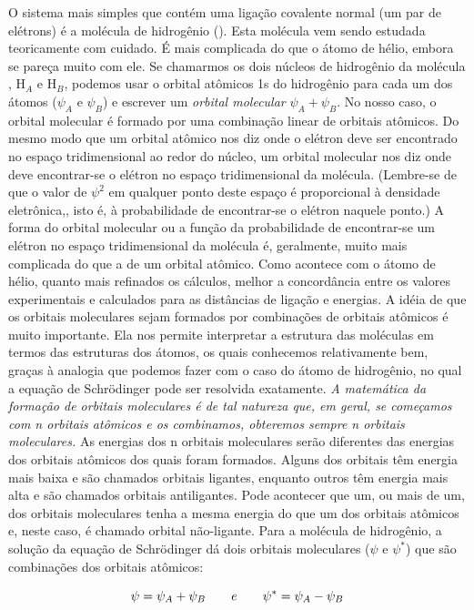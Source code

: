 O sistema mais simples que contém uma ligação covalente normal (um par de elétrons) é a molécula de hidrogênio (). Esta molécula vem sendo estudada teoricamente com cuidado. É mais complicada do que o átomo de hélio, embora se pareça muito com ele. Se chamarmos os dois núcleos de hidrogênio da molécula , H$_A$ e H$_B$, podemos usar o orbital atômicos 1s do hidrogênio para cada um dos átomos ($\psi _A$ e $\psi _B$) e escrever um \textit{orbital molecular} $\psi _A + \psi _B$. No nosso caso, o orbital molecular é formado por uma combinação linear de orbitais atômicos. Do mesmo modo que um orbital atômico nos diz onde o elétron deve ser encontrado no espaço tridimensional ao redor do núcleo, um orbital molecular nos diz onde deve encontrar-se o elétron no espaço tridimensional da molécula. (Lembre-se de que o valor de $\psi ^2$ em qualquer ponto deste espaço é proporcional à densidade eletrônica,, isto é, à probabilidade de encontrar-se o elétron naquele ponto.) A forma do orbital molecular ou a função da probabilidade de encontrar-se um elétron no espaço tridimensional da molécula é, geralmente, muito mais complicada do que a de um orbital atômico. Como acontece com o átomo de hélio, quanto mais refinados os cálculos, melhor a concordância entre os valores experimentais e calculados para as distâncias de ligação e energias. A idéia de que os orbitais moleculares sejam formados por combinações de orbitais atômicos é muito importante. Ela nos permite interpretar a estrutura das moléculas em termos das estruturas dos átomos, os quais conhecemos relativamente bem, graças à analogia que podemos fazer com o caso do átomo de hidrogênio, no qual a equação de Schrödinger pode ser resolvida exatamente. \textit{A matemática da formação de orbitais moleculares é de tal natureza que, em geral, se começamos com n orbitais atômicos e os combinamos, obteremos sempre n orbitais moleculares.} As energias dos n orbitais moleculares serão diferentes das energias dos orbitais atômicos dos quais foram formados. Alguns dos orbitais têm energia mais baixa e são chamados orbitais ligantes, enquanto outros têm energia mais alta e são chamados orbitais antiligantes. Pode acontecer que um, ou mais de um, dos orbitais moleculares tenha a mesma energia do que um dos orbitais atômicos e, neste caso, é chamado orbital não-ligante. Para a molécula de hidrogênio, a solução da equação de Schrödinger dá dois orbitais moleculares ($\psi$ e $\psi ^*$) que são combinações dos orbitais atômicos: 

\begin{equation}
    \setlength{\topsep}{.5ex}
    \psi = \psi _A + \psi _B
    \qquad e \qquad
    \psi ^* = \psi _A - \psi _B
\end{equation}

